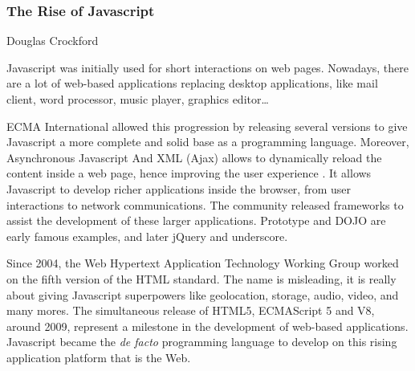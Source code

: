 \subsubsection{The Rise of Javascript}

%
{Douglas Crockford}

Javascript was initially used for short interactions on web pages.
Nowadays, there are a lot of web-based applications replacing desktop applications, like mail client, word processor, music player, graphics editor\ldots

ECMA International allowed this progression by releasing several versions to give Javascript a more complete and solid base as a programming language.
Moreover, %
Asynchronous Javascript And XML (Ajax) allows to dynamically reload the content inside a web page, hence improving the user experience \cite{Garrett2005}.
It allows Javascript to develop richer applications inside the browser, from user interactions to network communications.
The community released frameworks to assist the development of these larger applications.
Prototype and DOJO are early famous examples, and later jQuery and underscore.


Since 2004, the Web Hypertext Application Technology Working Group worked on the fifth version of the HTML standard.
The name is misleading, it is really about giving Javascript superpowers like geolocation, storage, audio, video, and many mores.
The simultaneous release of HTML5, ECMAScript 5 and V8, around 2009, represent a milestone in the development of web-based applications.
Javascript became the \textit{de facto} programming language to develop on this rising application platform that is the Web.

